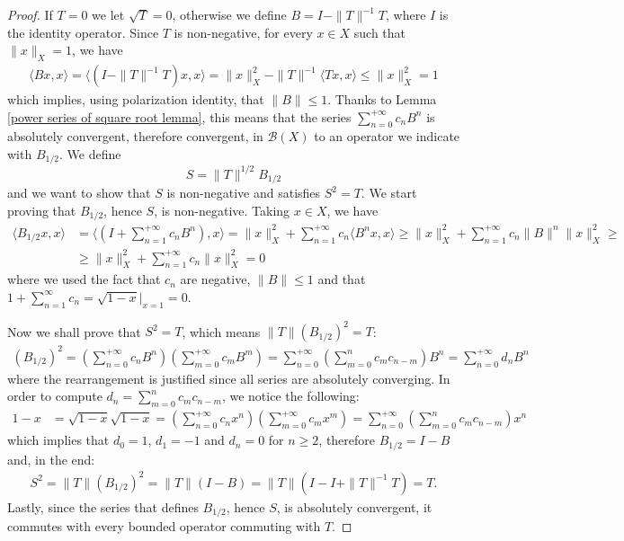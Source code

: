 \documentclass[corpo=11pt, stile=classica, tipotesi=custom,
greek, evenboxes, english]{toptesi}
\numberwithin{equation}{chapter}
\theoremstyle{remark}
\newcommand{\B}{\mathscr{B}} %
\begin{document}
\begin{proof}
	If $T=0$ we let $\sqrt{T}=0$, otherwise we define $B = I - \|T\|^{-1}T$, where $I$ is the identity operator.
	Since $T$ is non-negative, for every $x \in X$ such that $\|x\|_X = 1$, we have
	\begin{align*}
		\langle Bx,x \rangle = \langle (I-\|T\|^{-1}T)x, x\rangle = \|x\|_X^2 - \|T\|^{-1}\langle Tx,x \rangle \leq \|x\|_X^2 = 1
	\end{align*}
	which implies, {\color{red} using polarization identity}, that $\|B\| \leq 1$. Thanks to Lemma \ref{power series of square root lemma}, this means that the series $\sum_{n=0}^{+\infty}c_n B^n$ is absolutely convergent, therefore convergent, in $\B(X)$ to an operator we indicate with $B_{1/2}$. We define
	\begin{equation}\label{square root of an operator}
		S = \|T\|^{1/2} B_{1/2}
	\end{equation}
	and we want to show that $S$ is non-negative and satisfies $S^2 = T$. We start proving that $B_{1/2}$, hence $S$, is non-negative. Taking $x \in X$, we have
	\begin{align*}
		\langle B_{1/2}x,x \rangle &= \langle (I + \sum_{n=1}^{+\infty} c_n B^n),x \rangle = \|x\|_X^2 + \sum_{n=1}^{+\infty} c_n\langle B^n x,x \rangle \geq \|x\|_X^2 + \sum_{n=1}^{+\infty} c_n \|B\|^n \|x\|_X^2 \geq\\
								   &\geq \|x\|_X^2 + \sum_{n=1}^{+\infty} c_n \|x\|_X^2 = 0
	\end{align*}
	where we used the fact that $c_n$ are negative, $\|B\| \leq 1$ and that $1 + \sum_{n=1}^{\infty}c_n = \sqrt{1-x}\rvert_{x=1} = 0$.
	
	Now we shall prove that $S^2 = T$, which means $\|T\|(B_{1/2})^2 = T$:
	\begin{align*}
		(B_{1/2})^2 = \left(\sum_{n=0}^{+\infty}c_n B^n\right) \left(\sum_{m=0}^{+\infty}c_m B^m\right) = \sum_{n=0}^{+\infty} \left(\sum_{m=0}^{n} c_m c_{n-m}\right) B^n = \sum_{n=0}^{+\infty} d_n B^n
	\end{align*}
	where the rearrangement is justified since all series are absolutely converging. In order to compute $d_n = \sum_{m=0}^{n} c_m c_{n-m}$, we notice the following:
	\begin{align*}
			1-x &= \sqrt{1-x} \sqrt{1-x} = \left(\sum_{n=0}^{+\infty}c_n x^n\right) \left(\sum_{m=0}^{+\infty}c_m x^m\right) = \sum_{n=0}^{+\infty} \left(\sum_{m=0}^{n} c_m c_{n-m}\right) x^n 
	\end{align*}
	which implies that $d_0=1$, $d_1 = -1$ and $d_n = 0$ for $n \geq 2$, therefore $B_{1/2} = I - B$ and, in the end:
	\begin{align*}
		S^2 = \|T\|(B_{1/2})^2 = \|T\|(I - B) = \|T\|(I - I + \|T\|^{-1}T) = T.
	\end{align*}
	Lastly, since the series that defines $B_{1/2}$, hence $S$, is absolutely convergent, it commutes with every bounded operator commuting with $T$.


\end{proof}
\end{document}
